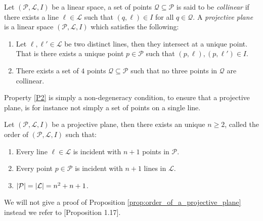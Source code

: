 \begin{definition}
	Let $(\mathcal{P}, \mathcal{L}, I)$ be a linear space, a set of points $\mathcal{Q} \subseteq \mathcal{P}$ is said to be \textit{collinear} if there exists a line $\ell \in \mathcal{L}$ such that $(q, \ell) \in I$ for all $q \in \mathcal{Q}$. A \textit{projective plane} is a linear space $(\mathcal{P}, \mathcal{L}, I)$ which satisfies the following:
	\begin{enumerate}[label=(P\arabic*), leftmargin=*]
		\item Let $\ell, \ell' \in \mathcal{L}$ be two distinct lines, then they intersect at a unique point. That is there exists a unique point $p \in \mathcal{P}$ such that $(p, \ell), (p, \ell') \in I$. \label{P1}
		\item There exists a set of $4$ points $\mathcal{Q} \subseteq \mathcal{P}$ such that no three points in $\mathcal{Q}$ are collinear. \label{P2}
	\end{enumerate}
\end{definition}
Property \ref{P2} is simply a non-degeneracy condition, to ensure that a projective plane, is for instance not simply a set of points on a single line.
\newpage
\begin{proposition}\label{prop:order_of_a_projective_plane}
	Let $(\mathcal{P}, \mathcal{L}, I)$ be a projective plane, then there exists an unique $n \geq 2$, called the order of $(\mathcal{P}, \mathcal{L}, I)$ such that:
	\begin{enumerate}
		\item Every line $\ell \in \mathcal{L}$ is incident with $n + 1$ points in $\mathcal{P}$.
		\item Every point $p \in \mathcal{P}$ is incident with $n + 1$ lines in $\mathcal{L}$.
		\item $\left\lvert\mathcal{P}\right\rvert = \left\lvert\mathcal{L}\right\rvert = n^2 + n + 1$. \label{prop:order_of_a_projective_plane3}
	\end{enumerate}
\end{proposition}
We will not give a proof of Proposition \ref{prop:order_of_a_projective_plane} instead we refer to \cite{fg_and_rt}[Proposition 1.17].

